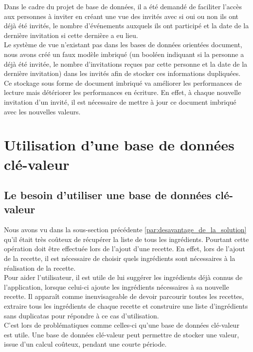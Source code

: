 		Dans le cadre du projet de base de données, il a été demandé de faciliter l'accès aux personnes à inviter en créant une vue des invités avec si oui ou non ils ont déjà été invités, le nombre d’événements auxquels ils ont participé et la date de la dernière invitation si cette dernière a eu lieu.\\

		Le système de vue n'existant pas dans les bases de données orientées document, nous avons créé un faux modèle imbriqué (un booléen indiquant si la personne a déjà été invitée, le nombre d'invitations reçues par cette personne et la date de la dernière invitation) dans les invités afin de stocker ces informations dupliquées. Ce stockage sous forme de document imbriqué va améliorer les performances de lecture mais détériorer les performances en écriture. En effet, à chaque nouvelle invitation d'un invité, il est nécessaire de mettre à jour ce document imbriqué avec les nouvelles valeurs.


\section{Utilisation d'une base de données clé-valeur}
	\subsection{Le besoin d'utiliser une base de données clé-valeur }
		Nous avons vu dans la sous-section précédente \ref{par:desavantage_de_la_solution} qu'il était très coûteux de récupérer la liste de tous les ingrédients. Pourtant cette opération doit être effectuée lors de l'ajout d'une recette. En effet, lors de l'ajout de la recette, il est nécessaire de choisir quels ingrédients sont nécessaires à la réalisation de la recette.\\

		Pour aider l'utilisateur, il est utile de lui suggérer les ingrédients déjà connus de l'application, lorsque celui-ci ajoute les ingrédients nécessaires à sa nouvelle recette. Il apparaît comme inenvisageable de devoir parcourir toutes les recettes, extraire tous les ingrédients de chaque recette et construire une liste d'ingrédients sans duplicatas pour répondre à ce cas d'utilisation.\\

		C'est lors de problématiques comme celles-ci qu'une base de données clé-valeur est utile. Une base de données clé-valeur peut permettre de stocker une valeur, issue d'un calcul coûteux, pendant une courte période.


